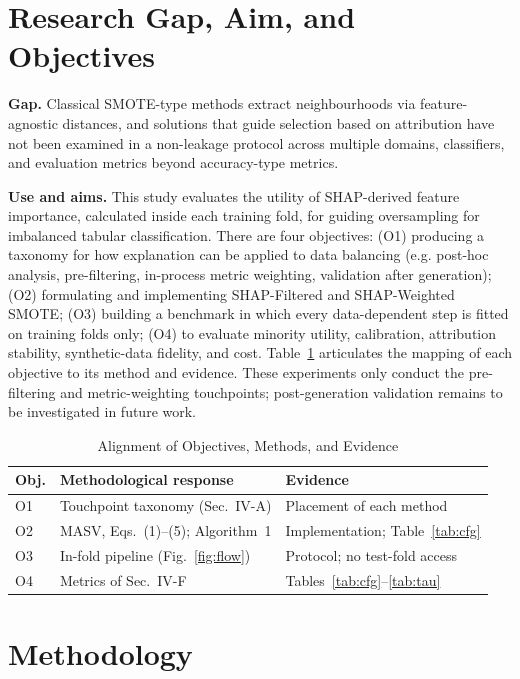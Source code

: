 \documentclass[conference]{IEEEtran}
\begin{document}
\section{Research Gap, Aim, and Objectives}
\textbf{Gap.} Classical SMOTE-type methods extract neighbourhoods via feature-agnostic distances, and solutions that guide selection based on attribution have not been examined in a non-leakage protocol across multiple domains, classifiers, and evaluation metrics beyond accuracy-type metrics.

\textbf{Use and aims.} This study evaluates the utility of SHAP-derived feature importance, calculated inside each training fold, for guiding oversampling for imbalanced tabular classification. There are four objectives: (O1) producing a taxonomy for how explanation can be applied to data balancing (e.g. post-hoc analysis, pre-filtering, in-process metric weighting, validation after generation); (O2) formulating and implementing SHAP-Filtered and SHAP-Weighted SMOTE; (O3) building a benchmark in which every data-dependent step is fitted on training folds only; (O4) to evaluate minority utility, calibration, attribution stability, synthetic-data fidelity, and cost. Table~\ref{tab:align} articulates the mapping of each objective to its method and evidence. These experiments only conduct the pre-filtering and metric-weighting touchpoints; post-generation validation remains to be investigated in future work.

\begin{table}[t]
\caption{Alignment of Objectives, Methods, and Evidence}
\label{tab:align}
\centering
\small
\begin{tabular}{p{}p{}p{}}
\toprule
\textbf{Obj.} & \textbf{Methodological response} & \textbf{Evidence} \\
\midrule
O1 & Touchpoint taxonomy (Sec.~IV-A) & Placement of each method \\
O2 & MASV, Eqs.~(1)--(5); Algorithm~1 & Implementation; Table~\ref{tab:cfg} \\
O3 & In-fold pipeline (Fig.~\ref{fig:flow}) & Protocol; no test-fold access \\
O4 & Metrics of Sec.~IV-F & Tables~\ref{tab:cfg}--\ref{tab:tau} \\
\bottomrule
\end{tabular}
\end{table}

\section{Methodology}
\end{document}
